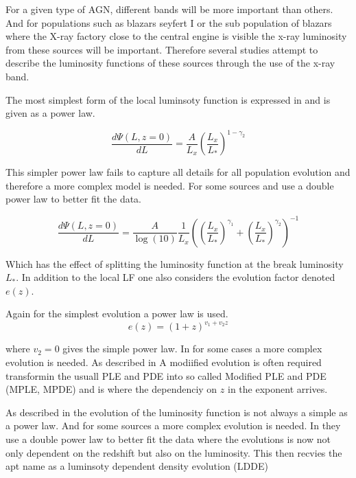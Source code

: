 \documentclass{article}
\begin{document}
For a given type of AGN, different bands will be more important than others. And for populations such as blazars seyfert I or the sub population of blazars where the 
X-ray factory close to the central engine is visible the x-ray luminosity from these sources will be important. 
Therefore several studies attempt to describe the luminosity functions of these sources through the use of the x-ray band. 

The most simplest form of the local luminsoty function is expressed in \cite{Ajello_2009} and is given as a power law.

\begin{equation}
    \frac{d\Psi(L,z=0)}{dL} = \frac{A}{L_x} \left( \frac{L_x}{L_*}\right)^{1-\gamma_2}
\end{equation}

This simpler power law fails to capture all details for all population evolution and
therefore a more complex model is needed. For some sources \cite{Ajello_2009} and  \cite{Ueda_2003} 
use a double power law to better fit the data.
   
\begin{equation}
    \frac{d\Psi(L,z=0)}{dL} =  \frac{A}{\log(10)} \frac{1}{L_x} \left( \left( \frac{L_x}{L_*} \right)^{\gamma_1} + \left( \frac{L_x}{L_*} \right)^{\gamma_2} \right)^{-1}
\end{equation}

Which has the effect of splitting the luminosity function at the break luminosity $L_*$.
In addition to the local LF one also considers the evolution factor denoted $e(z)$. 

Again for the simplest evolution a power law is used.
 $$
e(z) = (1 + z)^{v_1 + v_2 z}
 $$

 where $v_2 = 0$ gives the simple power law. In for some cases a more complex evolution is needed. As described in 
 \cite{Ajello_2009} A modiified evolution is often required transformin the usuall PLE and PDE into so called
 Modified PLE and PDE (MPLE, MPDE) and is where the dependenciy on $z$ in the exponent arrives. 

 As described in \cite{Ueda_2003} the evolution of the luminosity function is not always a simple as a power law.
 And for some sources a more complex evolution is needed. In \cite{Ueda_2003} they use a double power law to better fit the data where 
 the evolutions is now not only dependent on the redshift but also on the luminosity. This then recvies the apt name as a luminsoty dependent density evolution (LDDE)
\end{document}
